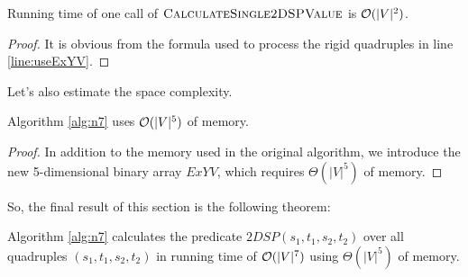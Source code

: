 \begin{proposition} \label{n7_rt2}
Running time of one call of $\textsc{CalculateSingle2DSPValue}$ is $\mathcal{O}(|V|^2)$.
\end{proposition}
\begin{proof}
It is obvious from the formula used to process the rigid quadruples in line \ref{line:useExYV}.
\end{proof}

Let's also estimate the space complexity.

\begin{proposition} \label{n7_m}
Algorithm \ref{alg:n7} uses $\mathcal{O}(|V|^5)$ of memory.
\end{proposition}
\begin{proof}
In addition to the memory used in the original algorithm, we introduce the new 5-dimensional binary array $ExYV$, which requires $\Theta(|V|^5)$ of memory.
\end{proof}

So, the final result of this section is the following theorem:
\begin{theorem}
Algorithm \ref{alg:n7} calculates the predicate $2DSP(s_1, t_1, s_2, t_2)$ over all quadruples $(s_1, t_1, s_2, t_2)$ in running time of $\mathcal{O}(|V|^7)$ using $\Theta(|V|^5)$ of memory. 
\end{theorem}
